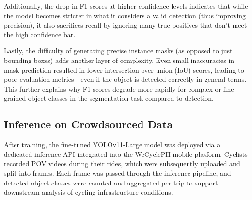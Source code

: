 Additionally, the drop in F1 scores at higher confidence levels indicates that while the model becomes stricter in what it considers a valid detection (thus improving precision), it also sacrifices recall by ignoring many true positives that don't meet the high confidence bar.

Lastly, the difficulty of generating precise instance masks (as opposed to just bounding boxes) adds another layer of complexity. Even small inaccuracies in mask prediction resulted in lower intersection-over-union (IoU) scores, leading to poor evaluation metrics—even if the object is detected correctly in general terms. This further explains why F1 scores degrade more rapidly for complex or fine-grained object classes in the segmentation task compared to detection.

\subsection{Inference on Crowdsourced Data}

After training, the fine-tuned YOLOv11-Large model was deployed via a dedicated inference API integrated into the WeCyclePH mobile platform. Cyclists recorded POV videos during their rides, which were subsequently uploaded and split into frames. Each frame was passed through the inference pipeline, and detected object classes were counted and aggregated per trip to support downstream analysis of cycling infrastructure conditions.

